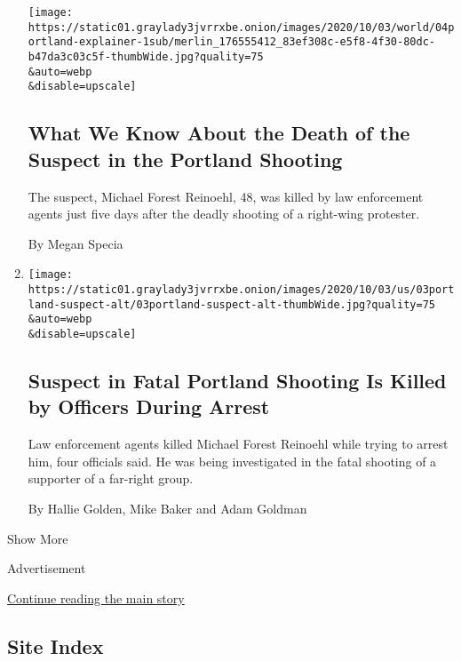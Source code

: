 \begin{enumerate}
  \texttt{[image: https://static01.graylady3jvrrxbe.onion/images/2020/10/03/world/04portland-explainer-1sub/merlin\_176555412\_83ef308c-e5f8-4f30-80dc-b47da3c03c5f-thumbWide.jpg?quality=75\\\&auto=webp\\\&disable=upscale]}

  \hypertarget{what-we-know-about-the-death-of-the-suspect-in-the-portland-shooting}{%
  \subsection{What We Know About the Death of the Suspect in the
  Portland
  Shooting}\label{what-we-know-about-the-death-of-the-suspect-in-the-portland-shooting}}

  The suspect, Michael Forest Reinoehl, 48, was killed by law
  enforcement agents just five days after the deadly shooting of a
  right-wing protester.

  By Megan Specia
\item
  \href{/2020/09/03/us/michael-reinoehl-arrest-portland-shooting.html}{}

  \texttt{[image: https://static01.graylady3jvrrxbe.onion/images/2020/10/03/us/03portland-suspect-alt/03portland-suspect-alt-thumbWide.jpg?quality=75\\\&auto=webp\\\&disable=upscale]}

  \hypertarget{suspect-in-fatal-portland-shooting-is-killed-by-officers-during-arrest}{%
  \subsection{Suspect in Fatal Portland Shooting Is Killed by Officers
  During
  Arrest}\label{suspect-in-fatal-portland-shooting-is-killed-by-officers-during-arrest}}

  Law enforcement agents killed Michael Forest Reinoehl while trying to
  arrest him, four officials said. He was being investigated in the
  fatal shooting of a supporter of a far-right group.

  By Hallie Golden, Mike Baker and Adam Goldman
\end{enumerate}

Show More

Advertisement

\protect\hyperlink{after-mid2}{Continue reading the main story}

\hypertarget{site-index}{%
\subsection{Site Index}\label{site-index}}


